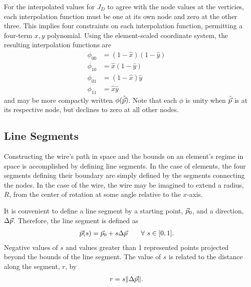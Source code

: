 For the interpolated values for $J_D$ to agree with the node values at the verticies, each interpolation function must be one at its own node and zero at the other three.  This implies four constraints on each interpolation function, permitting a four-term $x,y$ polynomial.  Using the element-scaled coordinate system, the resulting interpolation functions are
\begin{subequations}
\begin{align}
\phi_{00} &= (1-\hat{x})(1-\hat{y})\\
\phi_{10} &= \hat{x}(1-\hat{y})\\
\phi_{01} &= (1-\hat{x})\hat{y}\\
\phi_{11} &= \hat{x}\hat{y}
\end{align}
\end{subequations}
and may be more compactly written $\phi(\hat{\vec{p}})$.  Note that each $\phi$ is unity when $\hat{\vec{p}}$ is at its respective node, but declines to zero at all other nodes.

\subsection{Line Segments}\label{sec:segments}

Constructing the wire's path in space and the bounds on an element's regime in space is accomplished by defining line segments.  In the case of elements, the four segments defining their boundary are simply defined by the segments connecting the nodes.  In the case of the wire, the wire may be imagined to extend a radius, $R$, from the center of rotation at some angle relative to the $x$-axis.

It is convenient to define a line segment by a starting point, $\vec{p}_0$, and a direction, $\Delta \vec{p}$.  Therefore, the line segment is defined as
\begin{align}
\vec{p}(s) = \vec{p}_0 + s \Delta \vec{p} \hspace{2em} \forall \ s\in[0,1].
\end{align}
Negative values of $s$ and values greater than 1 represented points projected beyond the bounds of the line segment.  The value of $s$ is related to the distance along the segment, $r$, by
\begin{align}
r = s \| \Delta \vec{p} \|.
\end{align}

